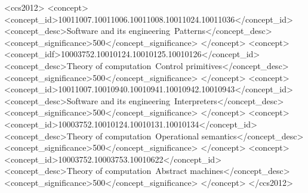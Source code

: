 \documentclass[sigplan,screen]{acmart}
\begin{document}
\begin{CCSXML}
<ccs2012>
   <concept>
       <concept_id>10011007.10011006.10011008.10011024.10011036</concept_id>
       <concept_desc>Software and its engineering~Patterns</concept_desc>
       <concept_significance>500</concept_significance>
       </concept>
   <concept>
       <concept_idf>10003752.10010124.10010125.10010126</concept_id>
       <concept_desc>Theory of computation~Control primitives</concept_desc>
       <concept_significance>500</concept_significance>
       </concept>
   <concept>
       <concept_id>10011007.10010940.10010941.10010942.10010943</concept_id>
       <concept_desc>Software and its engineering~Interpreters</concept_desc>
       <concept_significance>500</concept_significance>
       </concept>
   <concept>
       <concept_id>10003752.10010124.10010131.10010134</concept_id>
       <concept_desc>Theory of computation~Operational semantics</concept_desc>
       <concept_significance>500</concept_significance>
       </concept>
   <concept>
       <concept_id>10003752.10003753.10010622</concept_id>
       <concept_desc>Theory of computation~Abstract machines</concept_desc>
       <concept_significance>500</concept_significance>
       </concept>
 </ccs2012>
\end{CCSXML}


\end{document}
